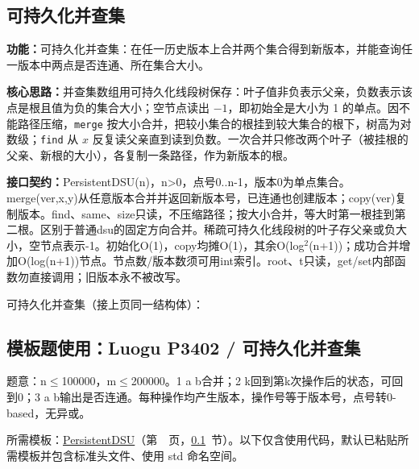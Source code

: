 \subsection{可持久化并查集}\label{compact-PersistentDSU}

\noindent\textbf{功能：}\allowbreak 可持久化并查集：在任一历史版本上合并两个集合得到新版本，并能查询任一版本中两点是否连通、所在集合大小。

\textbf{核心思路：}\allowbreak 并查集数组用可持久化线段树保存：叶子值非负表示父亲，负数表示该点是根且值为负的集合大小；空节点读出 $-1$，即初始全是大小为 1 的单点。因不能路径压缩，\texttt{merge} 按大小合并，把较小集合的根挂到较大集合的根下，树高为对数级；\texttt{find} 从 $x$ 反复读父亲直到读到负数。一次合并只修改两个叶子（被挂根的父亲、新根的大小），各复制一条路径，作为新版本的根。



{\sloppy{}\noindent\textbf{接口契约：}PersistentDSU(n)，n>0，点号0..n-1，版本0为单点集合。merge(ver,x,y)从任意版本合并并返回新版本号，已连通也创建版本；copy(ver)复制版本。find、same、size只读，不压缩路径；按大小合并，等大时第一根挂到第二根。区别于普通dsu的固定方向合并。稀疏可持久化线段树的叶子存父亲或负大小，空节点表示-1。初始化O(1)，copy均摊O(1)，其余O(log$^{2}$(n+1))；成功合并增加O(log(n+1))节点。节点数/版本数须可用int索引。root、t只读，get/set内部函数勿直接调用；旧版本永不被改写。\par}

\Needspace{677pt}



\newpage

\noindent 可持久化并查集（接上页同一结构体）：



\Needspace{457pt}

\subsection*{模板题使用：Luogu P3402 / 可持久化并查集}

\label{usage-example-248}

题意：n$\le$100000，m$\le$200000。1 a b合并；2 k回到第k次操作后的状态，可回到0；3 a b输出是否连通。每种操作均产生版本，操作号等于版本号，点号转0-based，无异或。

所需模板：\hyperref[compact-PersistentDSU]{PersistentDSU}（第~\pageref{compact-PersistentDSU}~页，\ref{compact-PersistentDSU}~节）。以下仅含使用代码，默认已粘贴所需模板并包含标准头文件、使用 std 命名空间。

